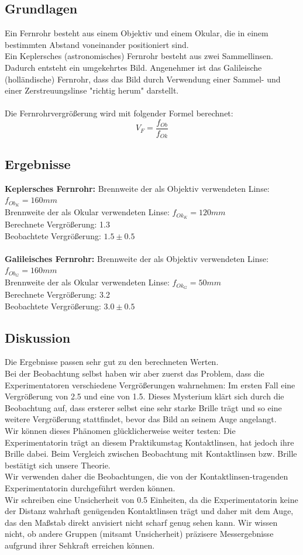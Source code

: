 \documentclass{article}
\begin{document}
\subsection{Grundlagen}
Ein Fernrohr besteht aus einem Objektiv und einem Okular, die in einem bestimmten Abstand voneinander positioniert sind.\\
Ein Keplersches (astronomisches) Fernrohr besteht aus zwei Sammellinsen. Dadurch entsteht ein umgekehrtes Bild. Angenehmer ist das Galileische (holländische) Fernrohr, dass das Bild durch Verwendung einer Sammel- und einer Zerstreuungslinse "richtig herum" darstellt.\\
\\
Die Fernrohrvergrößerung wird mit folgender Formel berechnet: 
$$V_F=\frac{f_{Ob}}{f_{Ok}}$$
\subsection{Ergebnisse}
\textbf{Keplersches Fernrohr:}
Brennweite der als Objektiv verwendeten Linse: $f_{Ob_K}=160mm$\\
Brennweite der als Okular verwendeten Linse: $f_{Ok_K}=120mm$\\
Berechnete Vergrößerung: 1.3\\
Beobachtete Vergrößerung: $1.5 \pm 0.5$\\
\\
\textbf{Galileisches Fernrohr:}
Brennweite der als Objektiv verwendeten Linse: $f_{Ob_G}=160mm$\\
Brennweite der als Okular verwendeten Linse: $f_{Ok_G}=50mm$\\
Berechnete Vergrößerung: 3.2\\
Beobachtete Vergrößerung: $3.0 \pm 0.5$\\

\subsection{Diskussion}
Die Ergebnisse passen sehr gut zu den berechneten Werten.\\
Bei der Beobachtung selbst haben wir aber zuerst das Problem, dass die Experimentatoren verschiedene Vergrößerungen wahrnehmen: Im ersten Fall eine Vergrößerung von 2.5 und eine von 1.5. Dieses Mysterium klärt sich durch die Beobachtung auf, dass ersterer selbst eine sehr starke Brille trägt und so eine weitere Vergrößerung stattfindet, bevor das Bild an seinem Auge angelangt.\\
Wir können dieses Phänomen glücklicherweise weiter testen: Die Experimentatorin trägt an diesem Praktikumstag Kontaktlinsen, hat jedoch ihre Brille dabei. Beim Vergleich zwischen Beobachtung mit Kontaktlinsen bzw. Brille bestätigt sich unsere Theorie.\\
Wir verwenden daher die Beobachtungen, die von der Kontaktlinsen-tragenden Experimentatorin durchgeführt werden können.\\
Wir schreiben eine Unsicherheit von 0.5 Einheiten, da die Experimentatorin keine der Distanz wahrhaft genügenden Kontaktlinsen trägt und daher mit dem Auge, das den Maßstab direkt anvisiert nicht scharf genug sehen kann. Wir wissen nicht, ob andere Gruppen (mitsamt Unsicherheit) präzisere Messergebnisse aufgrund ihrer Sehkraft erreichen können.
\end{document}
